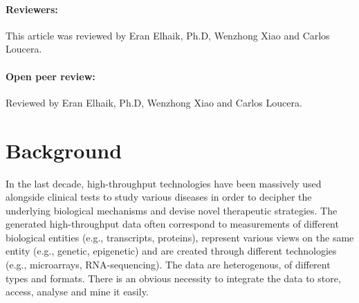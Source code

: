 \documentclass{bmcart}
\begin{document}
\begin{frontmatter}
\begin{abstractbox}
\begin{keyword}
\end{keyword}

\end{abstractbox}
%

\end{frontmatter}


\paragraph{Reviewers:}
This article was reviewed by Eran Elhaik, Ph.D, Wenzhong Xiao and Carlos Loucera.

\clearpage
\newpage
\paragraph{Open peer review:}
Reviewed by Eran Elhaik, Ph.D, Wenzhong Xiao and Carlos Loucera. 
\clearpage
\newpage

\section{Background}

In the last decade, high-throughput technologies have been massively
used alongside clinical tests to study various diseases in order to
decipher the underlying biological mechanisms and devise novel
therapeutic strategies. The generated high-throughput data often
correspond to measurements of different biological entities (e.g.,
transcripts, proteins), represent various views on the same entity
(e.g., genetic, epigenetic) and are created through different
technologies (e.g., microarrays, RNA-sequencing). The data are
heterogenous, of different types and formats. There is an obvious
necessity to integrate the data to store, access, analyse and 
mine it easily. 
\end{document}
